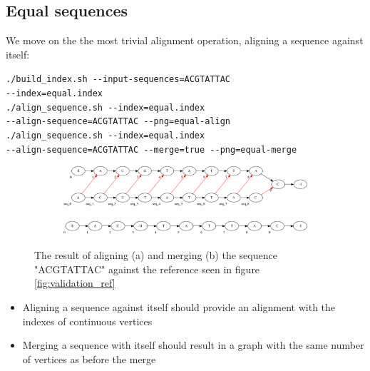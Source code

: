 \documentclass[thesis.tex]{subfiles}
\begin{document}
\subsection*{Equal sequences}
We move on the the most trivial alignment operation, aligning a sequence against itself:\\
\par\noindent
\texttt{./build\_index.sh -{}-input-sequences=ACGTATTAC\\
-{}-index=equal.index}\\
\texttt{./align\_sequence.sh -{}-index=equal.index\\
-{}-align-sequence=ACGTATTAC -{}-png=equal-align}\\
\texttt{./align\_sequence.sh -{}-index=equal.index\\
-{}-align-sequence=ACGTATTAC -{}-merge=true -{}-png=equal-merge}\\
\begin{figure}[!h]
  \begin{mdframed}
  \begin{subfigure}[t]{\textwidth}
      \includegraphics[width=\textwidth]{output/equal-align.png}
    \subcaption{}
  \end{subfigure}
  \begin{subfigure}[t]{\textwidth}
      \includegraphics[width=\textwidth]{output/equal-merge.png}
    \subcaption{}
  \end{subfigure} 
  \end{mdframed}
  \caption{The result of aligning (a) and merging (b) the sequence "ACGTATTAC" against the reference seen in figure \ref{fig:validation_ref}}
  \label{fig:validation_equal}
\end{figure}
\begin{itemize}
\item Aligning a sequence against itself should provide an alignment with the indexes of continuous vertices
\item Merging a sequence with itself should result in a graph with the same number of vertices as before the merge
\end{itemize}
\end{document}
